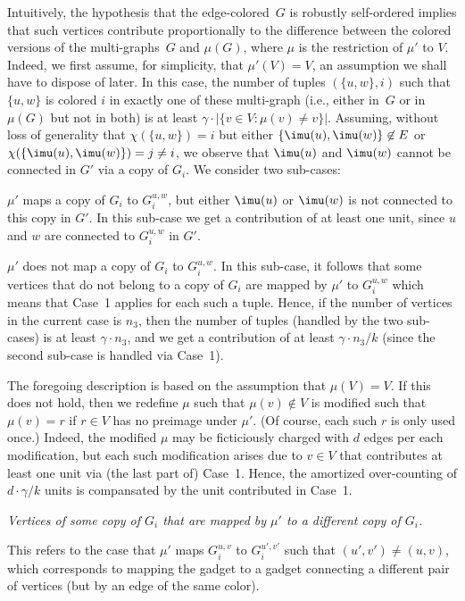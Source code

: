 %
Intuitively,
the hypothesis that the edge-colored~$G$ is robustly self-ordered
implies that such vertices contribute proportionally
to the difference between the colored versions of
the multi-graphs~$G$ and $\mu(G)$,
where $\mu$ is the restriction of $\mu'$ to $V$.
Indeed, we first assume, for simplicity, that $\mu'(V)=V$,
an assumption we shall have to dispose of later.
In this case, the number of tuples $(\{u,w\},i)$
such that $\{u,w\}$ is colored $i$ in exactly one of these multi-graph
(i.e., either in~$G$ or in $\mu(G)$ but not in both)
is at least $\gamma\cdot|\{v\!\in\!V:\mu(v)\neq v\}|$.
Assuming, without loss of generality that $\chi(\{u,w\})=i$
but either $\{\imu(u),\imu(w)\}\not\in E$
or $\chi(\{\imu(u),\imu(w)\})=j\neq i$,
we observe that $\imu(u)$ and $\imu(w)$ cannot
be connected in $G'$ via a copy of $G_i$.
We consider two sub-cases:
\BE
\item $\mu'$ maps a copy of $G_i$ to $G_i^{u,w}$,
but either $\imu(u)$ or $\imu(w)$ is not connected to this copy in $G'$.
In this sub-case we get a contribution of at least one unit,
since $u$ and $w$ are connected to $G_i^{u,w}$ in $G'$.
\item $\mu'$ does not map a copy of $G_i$ to $G_i^{u,w}$.
In this sub-case, it follows that some vertices that do not belong
to a copy of $G_i$ are mapped by $\mu'$ to $G_i^{u,w}$
which means that Case~1 applies for each such a tuple.
\EE
Hence, if the number of vertices in the current case is $n_3$,
then the number of tuples (handled by the two sub-cases)
is at least $\gamma\cdot n_3$, and we get a contribution
of at least $\gamma\cdot{n_3}/{k}$
(since the second sub-case is handled via Case~1).

The foregoing description is based on the assumption that $\mu(V)=V$.
If this does not hold, then we redefine $\mu$ such that $\mu(v)\not\in V$
is modified such that $\mu(v)=r$ if $r\in V$ has no preimage under $\mu'$.
(Of course, each such $r$ is only used once.)
Indeed, the modified $\mu$ may be ficticiously charged with $d$ edges
per each modification, but each such modification arises due to $v\in V$
that contributes at least one unit via (the last part of) Case~1.
Hence, the amortized over-counting of $d\cdot \gamma/k$ units
is compansated by the unit contributed in Case~1.
%

\item[{\em Case 4}:] {\em Vertices of some copy of $G_i$
that are mapped by $\mu'$ to a different copy of $G_i$.}

This refers to the case that $\mu'$ maps $G_i^{u,v}$
to $G_i^{u',v'}$ such that $(u',v')\neq(u,v)$,
which corresponds to mapping the gadget to a gadget
connecting a different pair of vertices
(but by an edge of the same color).


